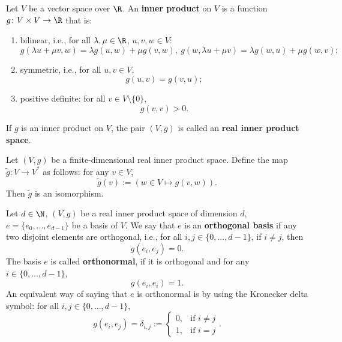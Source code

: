 \begin{definition}
  Let $V$ be a vector space over $\R$.
  An \textbf{inner product} on $V$ is a function
  $g \colon V \times V \to \R$ that is:
  \begin{enumerate}
    \item
      bilinear, i.e., for all $\lambda, \mu \in \R$, $u, v, w \in V$:
      \begin{equation}
        g(\lambda u + \mu v, w) = \lambda g(u, w) + \mu g(v, w),\
        g(w, \lambda u + \mu v) = \lambda g(w, u) + \mu g(w, v);
      \end{equation}
    \item
      symmetric, i.e., for all $u, v \in V$,
      \begin{equation}
        g(u, v) = g(v, u);
      \end{equation}
    \item
      positive definite: for all $v \in V \setminus \{0\}$,
      \begin{equation}
        g(v, v) > 0.
      \end{equation}
  \end{enumerate}
  If $g$ is an inner product on $V$, the pair $(V, g)$ is called an
  \textbf{real inner product space}.
\end{definition}
\begin{proposition}
  Let $(V, g)$ be a finite-dimensional real inner product space.
  Define the map $\tilde{g} \colon V \to V^*$ as follows: for any $v \in V$,
  \begin{equation}
    \tilde{g}(v) := (w \in V \mapsto g(v, w)).
  \end{equation}
  Then $\tilde{g}$ is an isomorphism.
\end{proposition}
\begin{definition}
  Let
    $d \in \N$,
    $(V, g)$ be a real inner product space of dimension $d$,
    $e = \{e_0, ..., e_{d - 1}\}$ be a basis of $V$.
  We say that $e$ is an \textbf{orthogonal basis} if any two disjoint elements
  are orthogonal, i.e., for all $i, j \in \{0, ..., d - 1\}$,
  if $i \neq j$, then
  \begin{equation}
    g(e_i, e_j) = 0.
  \end{equation}
  The basis $e$ is called \textbf{orthonormal}, if it is orthogonal and
  for any $i \in \{0, ..., d - 1\}$,
  \begin{equation}
     g(e_i, e_i) = 1.
  \end{equation}
  An equivalent way of saying that $e$ is orthonormal is by using the Kronecker
  delta symbol: for all $i, j \in \{0, ..., d - 1\}$,
  \begin{equation}
    g(e_i, e_j) = \delta_{i, j} :=
    \begin{cases}
      0, & \text{if $i \neq j$} \\
      1, & \text{if $i = j$}
    \end{cases}.
  \end{equation}
\end{definition}
